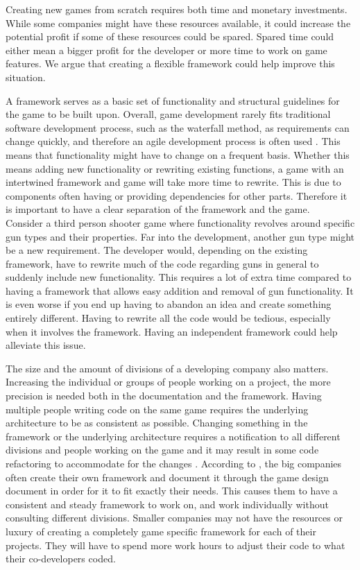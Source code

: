 Creating new games from scratch requires both time and monetary investments. While some companies might have these resources available, it could increase the potential profit if some of these resources could be spared. Spared time could either mean a bigger profit for the developer or more time to work on game features. We argue that creating a flexible framework could help improve this situation.

A framework serves as a basic set of functionality and structural guidelines for the game to be built upon. Overall, game development rarely fits traditional software development process, such as the waterfall method, as requirements can change quickly, and therefore an agile development process is often used \cite{Gamedevelopment}. This means that functionality might have to change on a frequent basis. Whether this means adding new functionality or rewriting existing functions, a game with an intertwined framework and game will take more time to rewrite. This is due to components often having or providing dependencies for other parts. Therefore it is important to have a clear separation of the framework and the game.\\

Consider a third person shooter game where functionality revolves around specific gun types and their properties. Far into the development, another gun type might be a new requirement. The developer would, depending on the existing framework, have to rewrite much of the code regarding guns in general to suddenly include new functionality. This requires a lot of extra time compared to having a framework that allows easy addition and removal of gun functionality. It is even worse if you end up having to abandon an idea and create something entirely different. Having to rewrite all the code would be tedious, especially when it involves the framework. Having an independent framework could help alleviate this issue.

The size and the amount of divisions of a developing company also matters. Increasing the individual or groups of people working on a project, the more precision is needed both in the documentation and the framework. Having multiple people writing code on the same game requires the underlying architecture to be as consistent as possible. Changing something in the framework or the underlying architecture requires a notification to all different divisions and people working on the game and it may result in some code refactoring to accommodate for the changes \cite{Gameprod}. According to \citet{Gamedesign}, the big companies often create their own framework and document it through the game design document in order for it to fit exactly their needs. This causes them to have a consistent and steady framework to work on, and work individually without consulting different divisions. Smaller companies may not have the resources or luxury of creating a completely game specific framework for each of their projects. They will have to spend more work hours to adjust their code to what their co-developers coded.

